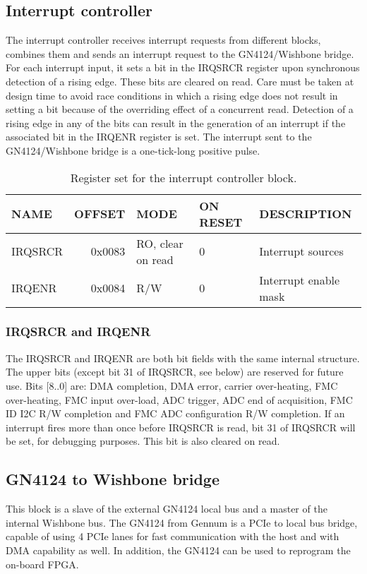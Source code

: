 \documentclass{article}
\begin{document}
\subsection{Interrupt controller}
The interrupt controller receives interrupt requests from different blocks, combines them and sends an interrupt request to the GN4124/Wishbone bridge. For each interrupt input, it sets a bit in the IRQSRCR register upon synchronous detection of a rising edge. These bits are cleared on read. Care must be taken at design time to avoid race conditions in which a rising edge does not result in setting a bit because of the overriding effect of a concurrent read. Detection of a rising edge in any of the bits can result in the generation of an interrupt if the associated bit in the IRQENR register is set. The interrupt sent to the GN4124/Wishbone bridge is a one-tick-long positive pulse.

\begin{table}[htbp]
  \centering
  \begin{tabularx}{\textwidth}{|l|r|X|l|l|}
    \hline
    \textbf{NAME} & \textbf{OFFSET} & \textbf{MODE} & \textbf{ON RESET} & \textbf{DESCRIPTION} \\
    \hline
    \hline
    IRQSRCR & 0x0083 & RO, clear on read & 0 & Interrupt sources\\
    \hline
    IRQENR & 0x0084 & R/W & 0 & Interrupt enable mask\\
    \hline
  \end{tabularx}
  \caption{Register set for the interrupt controller block.}
  \label{tab:irq_control}
\end{table}

\subsubsection{IRQSRCR and IRQENR}
The IRQSRCR and IRQENR are both bit fields with the same internal structure. The upper bits (except bit 31 of IRQSRCR, see below) are reserved for future use. Bits [8..0] are: DMA completion, DMA error, carrier over-heating, FMC over-heating, FMC input over-load, ADC trigger, ADC end of acquisition, FMC ID I2C R/W completion and FMC ADC configuration R/W completion. If an interrupt fires more than once before IRQSRCR is read, bit 31 of IRQSRCR will be set, for debugging purposes. This bit is also cleared on read.   

\subsection{GN4124 to Wishbone bridge}
\label{ssec:GN4124_WB}
This block is a slave of the external GN4124 local bus and a master of the internal Wishbone bus. The GN4124 from Gennum is a PCIe to local bus bridge, capable of using 4 PCIe lanes for fast communication with the host and with DMA capability as well. In addition, the GN4124 can be used to reprogram the on-board FPGA. 
\end{document}
